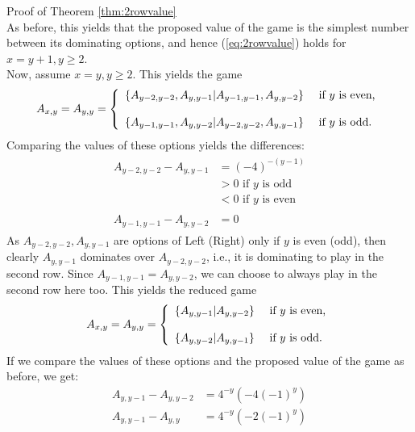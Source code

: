 \begin{proof2}{Proof of Theorem \ref{thm:2rowvalue}}
\begin{equation*}
\end{equation*}
As before, this yields that the proposed value of the game is the simplest number between its dominating options, and hence (\ref{eq:2rowvalue}) holds for $x=y+1,y\ge2$.
\\
Now, assume $x=y,y\ge2$. This yields the game
\begin{align*}
A_{x,y}=A_{y,y}=\left\{
\begin{array}{l l}
\left\{A_{y-2,y-2},A_{y,y-1}\middle|A_{y-1,y-1},A_{y,y-2}\right\}&\text{ if $y$ is even,}\\
~\\
\left\{A_{y-1,y-1},A_{y,y-2}\middle|A_{y-2,y-2},A_{y,y-1}\right\}&\text{ if $y$ is odd.}
\end{array}\right.
\end{align*}
Comparing the values of these options yields the differences:
\begin{align*}
\begin{split}
A_{y-2,y-2}-A_{y,y-1}&=(-4)^{-(y-1)}\\
&>0\text{ if $y$ is odd}\\
&<0\text{ if $y$ is even}
\end{split}\\
\begin{split}
A_{y-1,y-1}-A_{y,y-2}&=0
\end{split}
\end{align*}
As $A_{y-2,y-2},A_{y,y-1}$ are options of Left (Right) only if $y$ is even (odd), then clearly $A_{y,y-1}$ dominates over $A_{y-2,y-2}$, i.e., it is dominating to play in the second row. Since $A_{y-1,y-1}=A_{y,y-2}$, we can choose to always play in the second row here too. This yields the reduced game
\begin{align*}
A_{x,y}=A_{y,y}=\left\{
\begin{array}{l l}
\left\{A_{y,y-1}\middle|A_{y,y-2}\right\}&\text{ if $y$ is even,}\\
~\\
\left\{A_{y,y-2}\middle|A_{y,y-1}\right\}&\text{ if $y$ is odd.}
\end{array}\right.
\end{align*}
If we compare the values of these options and the proposed value of the game as before, we get:
\begin{equation*}
\begin{split}
A_{y,y-1}-A_{y,y-2}&=4^{-y}\left(-4(-1)^y\right)\\
A_{y,y-1}-A_{y,y}&=4^{-y}\left(-2(-1)^y\right)\\

\end{split}
\end{equation*}
\end{proof2}
